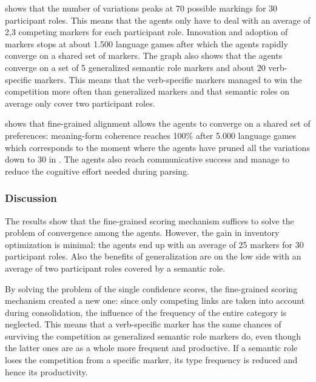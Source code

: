  shows that the number of variations peaks at 70 possible markings for 30 participant roles. This means that the agents only have to deal with an average of 2,3 competing markers for each participant role. Innovation and adoption of markers stops at about 1.500 language games after which the agents rapidly converge on a shared set of markers. The graph also shows that the agents converge on a set of 5 generalized semantic role markers and about 20 verb-specific markers. This means that the verb-specific markers managed to win the competition more often than generalized markers and that semantic roles on average only cover two participant roles.

\newpage
{} shows that fine-grained alignment allows the agents to converge on a shared set of preferences: meaning-form coherence reaches 100\% after 5.000 language games which corresponds to the moment where the agents have pruned all the variations down to 30 in . The agents also reach communicative success and manage to reduce the cognitive effort needed during parsing.

\largerpage[-1]
\subsubsection{Discussion}
 The results show that the fine-grained scoring mechanism suffices to solve the problem of convergence among the agents. However, the gain in inventory optimization is minimal: the agents end up with an average of 25 markers for 30 participant roles. Also the benefits of generalization are on the low side with an average of two participant roles covered by a semantic role.

By solving the problem of the single confidence scores, the fine-grained scoring mechanism created a new one: since only competing links are taken into account during consolidation, the influence of the frequency of the entire category is neglected. This means that a verb-specific marker has the same chances of surviving the competition as generalized semantic role markers do, even though the latter ones are as a whole more frequent and productive. If a semantic role loses the competition from a specific marker, its type frequency is reduced and hence its productivity.

